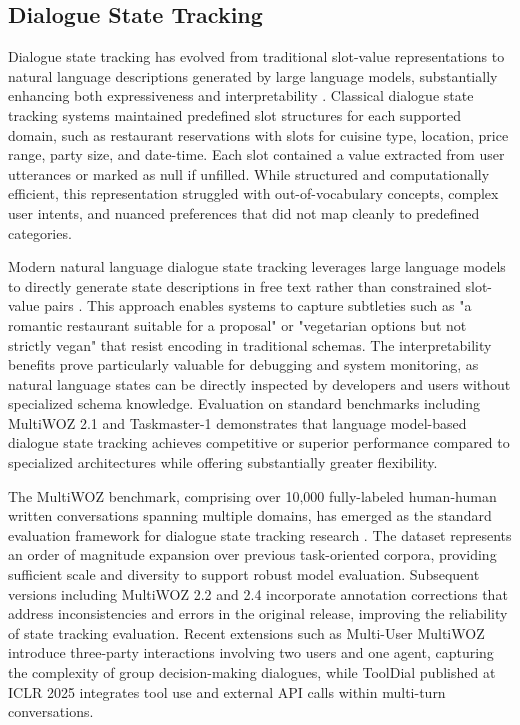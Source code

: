\subsection{Dialogue State Tracking}

Dialogue state tracking has evolved from traditional slot-value representations to natural language descriptions generated by large language models, substantially enhancing both expressiveness and interpretability \citep{feng2021dialogue}. Classical dialogue state tracking systems maintained predefined slot structures for each supported domain, such as restaurant reservations with slots for cuisine type, location, price range, party size, and date-time. Each slot contained a value extracted from user utterances or marked as null if unfilled. While structured and computationally efficient, this representation struggled with out-of-vocabulary concepts, complex user intents, and nuanced preferences that did not map cleanly to predefined categories.

Modern natural language dialogue state tracking leverages large language models to directly generate state descriptions in free text rather than constrained slot-value pairs \citep{feng2021dialogue}. This approach enables systems to capture subtleties such as "a romantic restaurant suitable for a proposal" or "vegetarian options but not strictly vegan" that resist encoding in traditional schemas. The interpretability benefits prove particularly valuable for debugging and system monitoring, as natural language states can be directly inspected by developers and users without specialized schema knowledge. Evaluation on standard benchmarks including MultiWOZ 2.1 and Taskmaster-1 demonstrates that language model-based dialogue state tracking achieves competitive or superior performance compared to specialized architectures while offering substantially greater flexibility.

The MultiWOZ benchmark, comprising over 10,000 fully-labeled human-human written conversations spanning multiple domains, has emerged as the standard evaluation framework for dialogue state tracking research \citep{budzianowski2018multiwoz}. The dataset represents an order of magnitude expansion over previous task-oriented corpora, providing sufficient scale and diversity to support robust model evaluation. Subsequent versions including MultiWOZ 2.2 and 2.4 incorporate annotation corrections that address inconsistencies and errors in the original release, improving the reliability of state tracking evaluation. Recent extensions such as Multi-User MultiWOZ introduce three-party interactions involving two users and one agent, capturing the complexity of group decision-making dialogues, while ToolDial published at ICLR 2025 integrates tool use and external API calls within multi-turn conversations.

